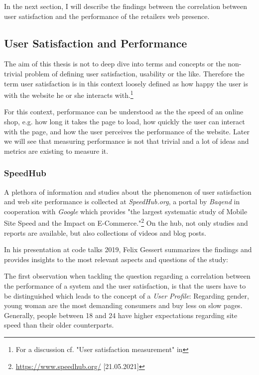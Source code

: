 In the next section, I will describe the findings between the correlation between user satisfaction and the performance of the retailers web presence.





\subsection{User Satisfaction and Performance}

The aim of this thesis is not to deep dive into terms and concepts or the non-trivial problem of defining user satisfaction, usability or the like.
Therefore the term user satisfaction is in this context loosely defined as how happy the user is with the website he or she interacts with.\footnote{For a discussion cf. "User satisfaction measurement" in } %

For this context, performance can be understood as the the speed of an online shop, e.g. how long it takes the page to load, how quickly the user can interact with the page, and how the user perceives the performance of the website.
Later we will see that measuring performance is not that trivial and a lot of ideas and metrics are existing to measure it.


\subsubsection{SpeedHub}

A plethora of information and studies about the phenomenon of user satisfaction and web site performance is collected at \textit{SpeedHub.org}, a portal by \textit{Baqend} in cooperation with \textit{Google} which provides "the largest systematic study of Mobile Site Speed and the Impact on E-Commerce."\footnote{\url{https://www.speedhub.org/} [21.05.2021]}
On the hub, not only studies and reports are available, but also collections of videos and blog posts.

In his presentation at code talks 2019, Felix Gessert summarizes the findings and provides insights to the most relevant aspects and questions of the study: %

The first observation when tackling the question regarding a correlation between the performance of a system and the user satisfaction, is that the users have to be distinguished which leads to the concept of a \textit{User Profile}: Regarding gender, young woman are the most demanding consumers and buy less on slow pages.
Generally, people between 18 and 24 have higher expectations regarding site speed than their older counterparts.

